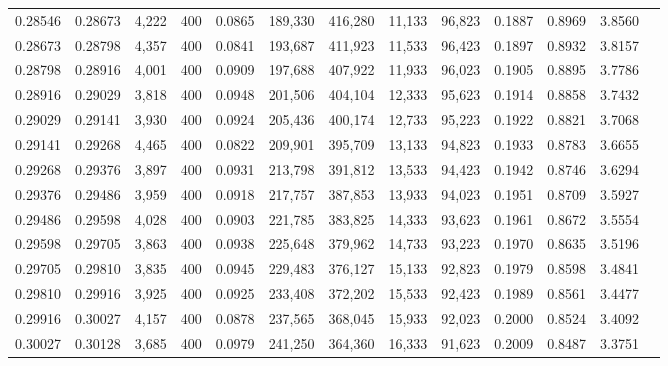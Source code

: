 \begin{tabular}{rrrrrrrrrrrrr}
0.28546 & 0.28673 &  4,222 & 400 &                                     0.0865 & 189,330 & 416,280 &  11,133 &  96,823 & 0.1887 & 0.8969 & 3.8560 \\
0.28673 & 0.28798 &  4,357 & 400 &                                     0.0841 & 193,687 & 411,923 &  11,533 &  96,423 & 0.1897 & 0.8932 & 3.8157 \\
0.28798 & 0.28916 &  4,001 & 400 &                                     0.0909 & 197,688 & 407,922 &  11,933 &  96,023 & 0.1905 & 0.8895 & 3.7786 \\
0.28916 & 0.29029 &  3,818 & 400 &                                     0.0948 & 201,506 & 404,104 &  12,333 &  95,623 & 0.1914 & 0.8858 & 3.7432 \\
0.29029 & 0.29141 &  3,930 & 400 &                                     0.0924 & 205,436 & 400,174 &  12,733 &  95,223 & 0.1922 & 0.8821 & 3.7068 \\
0.29141 & 0.29268 &  4,465 & 400 &                                     0.0822 & 209,901 & 395,709 &  13,133 &  94,823 & 0.1933 & 0.8783 & 3.6655 \\
0.29268 & 0.29376 &  3,897 & 400 &                                     0.0931 & 213,798 & 391,812 &  13,533 &  94,423 & 0.1942 & 0.8746 & 3.6294 \\
0.29376 & 0.29486 &  3,959 & 400 &                                     0.0918 & 217,757 & 387,853 &  13,933 &  94,023 & 0.1951 & 0.8709 & 3.5927 \\
0.29486 & 0.29598 &  4,028 & 400 &                                     0.0903 & 221,785 & 383,825 &  14,333 &  93,623 & 0.1961 & 0.8672 & 3.5554 \\
0.29598 & 0.29705 &  3,863 & 400 &                                     0.0938 & 225,648 & 379,962 &  14,733 &  93,223 & 0.1970 & 0.8635 & 3.5196 \\
0.29705 & 0.29810 &  3,835 & 400 &                                     0.0945 & 229,483 & 376,127 &  15,133 &  92,823 & 0.1979 & 0.8598 & 3.4841 \\
0.29810 & 0.29916 &  3,925 & 400 &                                     0.0925 & 233,408 & 372,202 &  15,533 &  92,423 & 0.1989 & 0.8561 & 3.4477 \\
0.29916 & 0.30027 &  4,157 & 400 &                                     0.0878 & 237,565 & 368,045 &  15,933 &  92,023 & 0.2000 & 0.8524 & 3.4092 \\
0.30027 & 0.30128 &  3,685 & 400 &                                     0.0979 & 241,250 & 364,360 &  16,333 &  91,623 & 0.2009 & 0.8487 & 3.3751 \\

\end{tabular}
